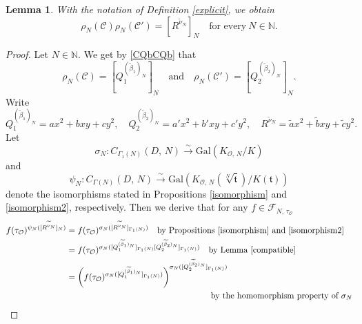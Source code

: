 \documentclass[reqno,11pt]{article}
\theoremstyle{plain} %
\newtheorem{lemma}[theorem]{\indent\sc Lemma}
\theoremstyle{definition} %
\begin{document}
\begin{lemma}\label{mainlemma}
With the notation of Definition \ref{explicit}, 
we obtain
\begin{equation*}
\rho_N(\mathcal{C})\rho_N(\mathcal{C}')=
[R^{\widetilde{\nu}_N}]_N\quad\textrm{for every}~N\in\mathbb{N}.
\end{equation*}
\end{lemma}
\begin{proof}
Let $N\in\mathbb{N}$. We get by \eqref{CQbCQb} that
\begin{equation}\label{rQNrQN}
\rho_N(\mathcal{C})=[Q_1^{(\widetilde{\beta}_1)_N}]_N
\quad\textrm{and}\quad\rho_N(\mathcal{C}')=[Q_2^{(\widetilde{\beta}_2)_N}]_N.
\end{equation}
Write
\begin{equation}\label{RCRCR}
Q_1^{(\widetilde{\beta}_1)_N}=ax^2+bxy+cy^2,\quad
Q_2^{(\widetilde{\beta}_2)_N}=a'x^2+b'xy+c'y^2,\quad
R^{\widetilde{\nu}_N}=\widetilde{a}x^2+\widetilde{b}xy+\widetilde{c}y^2. 
\end{equation}
Let
\begin{equation*}
\sigma_N:C_{\Gamma_1(N)}(D,\,N)\stackrel{\sim}{\rightarrow}
\mathrm{Gal}(K_{\mathcal{O},\,N}/K)
\end{equation*}
and
\begin{equation*}
\psi_N:C_{\Gamma(N)}(D,\,N)\stackrel{\sim}{\rightarrow}
\mathrm{Gal}\left(K_{\mathcal{O},\,N}(\sqrt[N]{\mathfrak{t}})/
K(\mathfrak{t})\right)
\end{equation*}
denote the isomorphisms stated in Propositions \ref{isomorphism} and \ref{isomorphism2}, respectively. 
Then we derive that for any $f\in\mathcal{F}_{N,\,\tau_\mathcal{O}}$
\begin{equation}\label{special}
\begin{aligned}
f(\tau_\mathcal{O})^{\psi_N([R^{\widetilde{\nu}_N}]_N)}&=
f(\tau_\mathcal{O})^{\sigma_N([R^{\widetilde{\nu}_N}]_{\Gamma_1(N)})}
\quad\textrm{by Propositions \ref{isomorphism} and \ref{isomorphism2}}\\
&=f(\tau_\mathcal{O})^{\sigma_N([Q_1^{(\widetilde{\beta}_1)_N}]_{\Gamma_1(N)}
[Q_2^{(\widetilde{\beta}_2)_N}]_{\Gamma_1(N)})}\quad\textrm{by 
Lemma \ref{compatible}}\\
&=\left(f(\tau_\mathcal{O})^{\sigma_N([Q_1^{(\widetilde{\beta}_1)_N}]_{\Gamma_1(N)})}
\right)^{\sigma_N([Q_2^{(\widetilde{\beta}_2)_N}]_{\Gamma_1(N)})}\\
&\hspace{6cm}\textrm{by the homomorphism property of $\sigma_N$}\\

\end{aligned}
\end{equation}
\end{proof}
\end{document}
